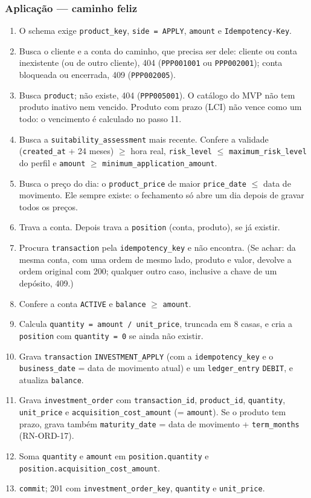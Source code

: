\documentclass[11pt,a4paper]{article}
\newcommand{\tb}[1]{\texttt{#1}}
\begin{document}
\subsubsection*{Aplicação --- caminho feliz}
\begin{enumerate}
  \item O schema exige \tb{product_key}, \tb{side = APPLY}, \tb{amount} e \tb{Idempotency-Key}.
  \item Busca o cliente e a conta do caminho, que precisa ser dele: cliente ou conta inexistente
        (ou de outro cliente), 404 (\tb{PPP001001} ou \tb{PPP002001}); conta bloqueada ou
        encerrada, 409 (\tb{PPP002005}).
  \item Busca \tb{product}; não existe, 404 (\tb{PPP005001}). O catálogo do MVP não tem produto
        inativo nem vencido. Produto com prazo (LCI) não vence como um todo: o vencimento é
        calculado no passo 11.
  \item Busca a \tb{suitability_assessment} mais recente. Confere a validade (\tb{created_at} +
        24 meses) $\geq$ hora real,
        \tb{risk_level} $\leq$ \tb{maximum_risk_level} do perfil e \tb{amount} $\geq$
        \tb{minimum_application_amount}.
  \item Busca o preço do dia: o \tb{product_price} de maior \tb{price_date} $\leq$ data de
        movimento. Ele sempre existe: o fechamento só abre um dia depois de gravar todos os preços.
  \item Trava a conta. Depois trava a \tb{position} (conta, produto), se já existir.
  \item Procura \tb{transaction} pela \tb{idempotency_key} e não encontra. (Se achar: da mesma
        conta, com uma ordem de mesmo lado, produto e valor, devolve a ordem original com 200;
        qualquer outro caso, inclusive a chave de um depósito, 409.)
  \item Confere a conta \tb{ACTIVE} e \tb{balance} $\geq$ \tb{amount}.
  \item Calcula \tb{quantity = amount / unit_price}, truncada em 8 casas, e cria a
        \tb{position} com \tb{quantity = 0} se ainda não existir.
  \item Grava \tb{transaction} \tb{INVESTMENT_APPLY} (com a \tb{idempotency_key} e o
        \tb{business_date} = data de movimento atual) e um
        \tb{ledger_entry} \tb{DEBIT}, e atualiza \tb{balance}.
  \item Grava \tb{investment_order} com \tb{transaction_id}, \tb{product_id}, \tb{quantity},
        \tb{unit_price} e \tb{acquisition_cost_amount} (= \tb{amount}). Se o produto tem prazo,
        grava também \tb{maturity_date} = data de movimento + \tb{term_months} (RN-ORD-17).
  \item Soma \tb{quantity} e \tb{amount} em \tb{position.quantity} e
        \tb{position.acquisition_cost_amount}.
  \item \tb{commit}; 201 com \tb{investment_order_key}, \tb{quantity} e \tb{unit_price}.
\end{enumerate}
\end{document}
